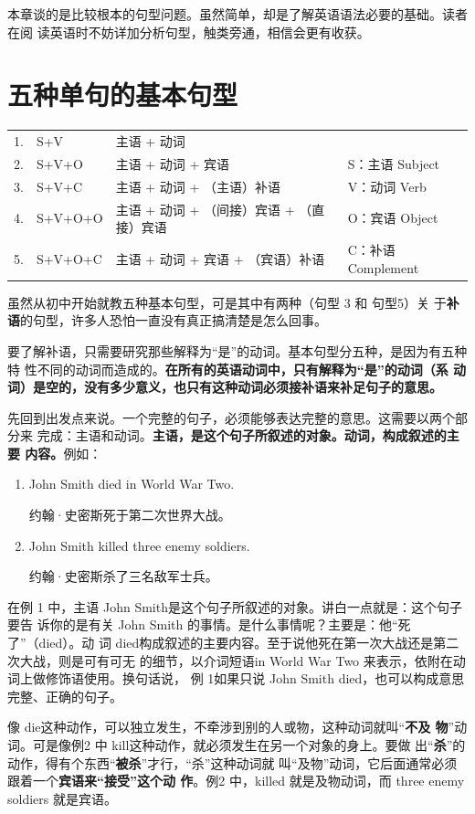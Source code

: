 本章谈的是比较根本的句型问题。虽然简单，却是了解英语语法必要的基础。读者在阅
读英语时不妨详加分析句型，触类旁通，相信会更有收获。

\section{五种单句的基本句型}

\begin{longtable}[]{@{}llll@{}}
  1. & S+V & 主语 + 动词 & \\
  2. & S+V+O & 主语 + 动词 + 宾语 & S：主语 Subject \\
  3. & S+V+C & 主语 + 动词 + （主语）补语 & V：动词 Verb \\
  4. & S+V+O+O & 主语 + 动词 + （间接）宾语 + （直接）宾语 & O：宾语 Object \\
  5. & S+V+O+C & 主语 + 动词 + 宾语 + （宾语）补语 & C：补语 Complement
\end{longtable}

虽然从初中开始就教五种基本句型，可是其中有两种（句型 3 和 句型5）关
于\textbf{补语}的句型，许多人恐怕一直没有真正搞清楚是怎么回事。

要了解补语，只需要研究那些解释为“是”的动词。基本句型分五种，是因为有五种特
性不同的动词而造成的。\textbf{在所有的英语动词中，只有解释为“是”的动词（系
  动词）是空的，没有多少意义，也只有这种动词必须接补语来补足句子的意思。}

先回到出发点来说。一个完整的句子，必须能够表达完整的意思。这需要以两个部分来
完成：主语和动词。\textbf{主语，是这个句子所叙述的对象。动词，构成叙述的主要
  内容。}例如：

\begin{enumerate}
\item John Smith died in World War Two.

  约翰·史密斯死于第二次世界大战。
\item John Smith killed three enemy soldiers.

  约翰·史密斯杀了三名敌军士兵。
\end{enumerate}

在例 1 中，主语 John Smith是这个句子所叙述的对象。讲白一点就是：这个句子要告
诉你的是有关 John Smith 的事情。是什么事情呢？主要是：他“死了”（died）。动
词 died构成叙述的主要内容。至于说他死在第一次大战还是第二次大战，则是可有可无
的细节，以介词短语in World War Two 来表示，依附在动词上做修饰语使用。换句话说，
例 1如果只说 John Smith died，也可以构成意思完整、正确的句子。

像 die这种动作，可以独立发生，不牵涉到别的人或物，这种动词就叫“\textbf{不及
  物}”动词。可是像例2 中 kill这种动作，就必须发生在另一个对象的身上。要做
出“\textbf{杀}”的动作，得有个东西“\textbf{被杀}”才行，“杀”这种动词就
叫“及物”动词，它后面通常必须跟着一个\textbf{宾语来“接受”这个动
  作}。例2 中，killed 就是及物动词，而 three enemy soldiers 就是宾语。


